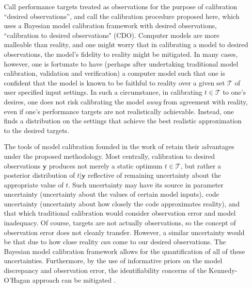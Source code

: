 \documentclass[12pt]{article}
\begin{document}
%
%
Call performance targets treated as observations for the purpose of calibration ``desired observations'', and call the calibration procedure proposed here, which uses a Bayesian model calibration framework with desired observations, ``calibration to desired observations" (CDO). 
%
Computer models are more malleable than reality, and one might worry that in calibrating a model to desired observations, the model's fidelity to reality might be mitigated.
%
%
In many cases, however, one is fortunate to have (perhaps after undertaking traditional model calibration, validation and verification) a computer model such that one is confident that the model is known to be faithful to reality over a given set $\mathcal T$ of user specified input settings.
%
In such a circumstance, in calibrating $t\in\mathcal T$ to one's desires, one does not risk calibrating the model \emph{away} from agreement with reality, even if one's performance targets are not realistically achievable. 
%
Instead, one finds a distribution on the settings that achieve the best realistic approximation to the desired targets.

The tools of model calibration founded in the work of \cite{Kennedy2001} retain their advantages under the proposed methodology.
%
Most centrally, calibration to desired observations $\mathbf y$ produces not merely a static optimum $t\in\mathcal T$, but rather a posterior distribution of $t|\mathbf y$ reflective of remaining uncertainty about the appropriate value of $t$. 
%
Such uncertainty may have its source in parameter uncertainty (uncertainty about the values of certain model inputs), code uncertainty (uncertainty about how closely the code approximates reality), and that which traditional calibration would consider observation error and model inadequacy. 
%
Of course,  targets are not actually observations, so the concept of observation error does not cleanly transfer. 
%
However, a similar uncertainty would be that due to how close reality \emph{can} come to our desired observations. 
%
The Bayesian model calibration framework allows for the quantification of all of these uncertainties. 
%
Furthermore, by the use of informative priors on the model discrepancy and observation error, the identifiability concerns of the Kennedy-O'Hagan approach can be mitigated \citep{Bayarri2007,Tuo2016}.
\end{document}
